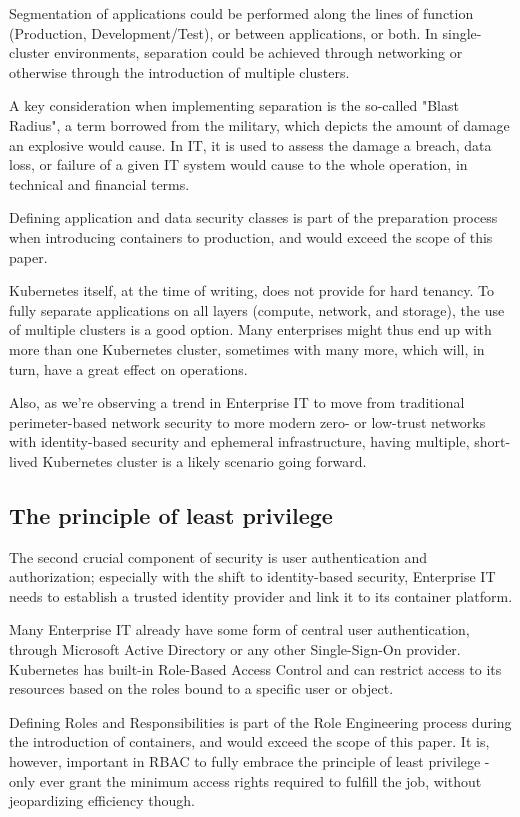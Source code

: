 Segmentation of applications could be performed along the lines of function (Production, Development/Test), or between applications, or both. In single-cluster environments, separation could be achieved through networking or otherwise through the introduction of multiple clusters. 

A key consideration when implementing separation is the so-called "Blast Radius", a term borrowed from the military, which depicts the amount of damage an explosive would cause. In IT, it is used to assess the damage a breach, data loss, or failure of a given IT system would cause to the whole operation, in technical and financial terms.

Defining application and data security classes is part of the preparation process when introducing containers to production, and would exceed the scope of this paper.

Kubernetes itself, at the time of writing, does not provide for hard tenancy. To fully separate applications on all layers (compute, network, and storage), the use of multiple clusters is a good option. Many enterprises might thus end up with more than one Kubernetes cluster, sometimes with many more, which will, in turn, have a great effect on operations.

Also, as we're observing a trend in Enterprise IT to move from traditional perimeter-based network security to more modern zero- or low-trust networks with identity-based security and ephemeral infrastructure, having multiple, short-lived Kubernetes cluster is a likely scenario going forward.

\subsection{The principle of least privilege}

The second crucial component of security is user authentication and authorization; especially with the shift to identity-based security, Enterprise IT needs to establish a trusted identity provider and link it to its container platform.

Many Enterprise IT already have some form of central user authentication, through Microsoft Active Directory or any other Single-Sign-On provider. Kubernetes has built-in Role-Based Access Control and can restrict access to its resources based on the roles bound to a specific user or object.

Defining Roles and Responsibilities is part of the Role Engineering process during the introduction of containers, and would exceed the scope of this paper. It is, however, important in RBAC to fully embrace the principle of least privilege - only ever grant the minimum access rights required to fulfill the job, without jeopardizing efficiency though. 

